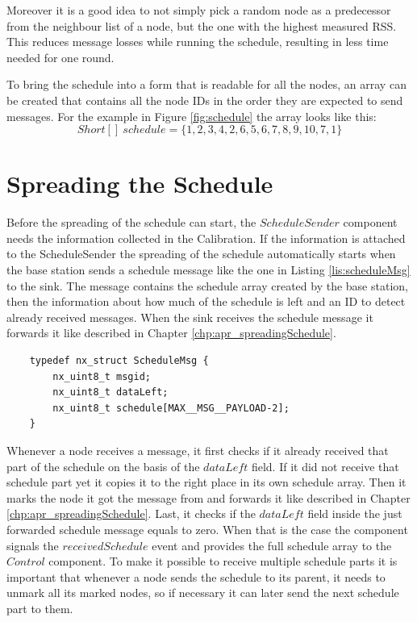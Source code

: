 Moreover it is a good idea to not simply pick a random node as a predecessor from the neighbour list of a node, but the one with the highest measured RSS. This reduces message losses while running the schedule, resulting in less time needed for one round.  

To bring the schedule into a form that is readable for all the nodes, an array can be created that contains all the node IDs in the order they are expected to send messages. For the example in Figure \ref{fig:schedule} the array looks like this: 
\[ Short[]\ schedule = \{1, 2, 3, 4, 2, 6, 5, 6, 7, 8, 9, 10, 7, 1\}\]     
\section{Spreading the Schedule}
Before the spreading of the schedule can start, the $ScheduleSender$ component needs the information collected in the Calibration. If the information is attached to the ScheduleSender the spreading of the schedule automatically starts when the base station sends a schedule message like the one in  Listing \ref{lis:scheduleMsg} to the sink. The message contains the schedule array created by the base station, then the information about how much of the schedule is left and an ID to detect already received messages. When the sink receives the schedule message it forwards it like described in Chapter \ref{chp:apr_spreadingSchedule}.

\begin{lstlisting}
	typedef nx_struct ScheduleMsg {
		nx_uint8_t msgid;	
		nx_uint8_t dataLeft;
		nx_uint8_t schedule[MAX__MSG__PAYLOAD-2];
	}
\end{lstlisting}

Whenever a node receives a message, it first checks if it already received that part of the schedule on the basis of the $dataLeft$ field. If it did not receive that schedule part yet it copies it to the right place in its own schedule array. Then it marks the node it got the message from and forwards it like described in Chapter \ref{chp:apr_spreadingSchedule}. Last, it checks if the $dataLeft$ field inside the just forwarded schedule message equals to zero. When that is the case the component signals the $receivedSchedule$ event and provides the full schedule array to the $Control$ component.
To make it possible to receive multiple schedule parts it is important that whenever a node sends the schedule to its parent, it needs to unmark all its marked nodes, so if necessary it can later send the next schedule part to them.

